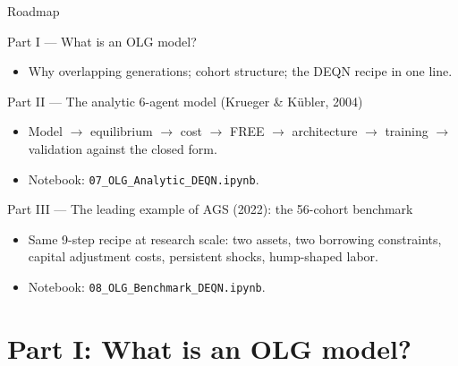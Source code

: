 \documentclass[aspectratio=169,11pt]{beamer}
\begin{document}
\begin{frame}{Roadmap}
\footnotesize
\begin{block}{Part I --- What is an OLG model?}
\vspace{-3pt}\begin{itemize}\itemsep0pt
    \item Why overlapping generations; cohort structure; the DEQN recipe in one line.
\end{itemize}
\end{block}
\vspace{-2pt}
\begin{block}{Part II --- The analytic 6-agent model (Krueger \& K\"ubler, 2004)}
\vspace{-3pt}\begin{itemize}\itemsep0pt
    \item Model $\to$ equilibrium $\to$ cost $\to$ FREE $\to$ architecture $\to$ training $\to$ validation against the closed form.
    \item Notebook: \texttt{07\_OLG\_Analytic\_DEQN.ipynb}.
\end{itemize}
\end{block}
\vspace{-2pt}
\begin{block}{Part III --- The leading example of AGS (2022): the 56-cohort benchmark}
\vspace{-3pt}\begin{itemize}\itemsep0pt
    \item Same 9-step recipe at research scale: two assets, two borrowing constraints, capital adjustment costs, persistent shocks, hump-shaped labor.
    \item Notebook: \texttt{08\_OLG\_Benchmark\_DEQN.ipynb}.
\end{itemize}
\end{block}
\end{frame}



\section{Part I: What is an OLG model?}
\end{document}
